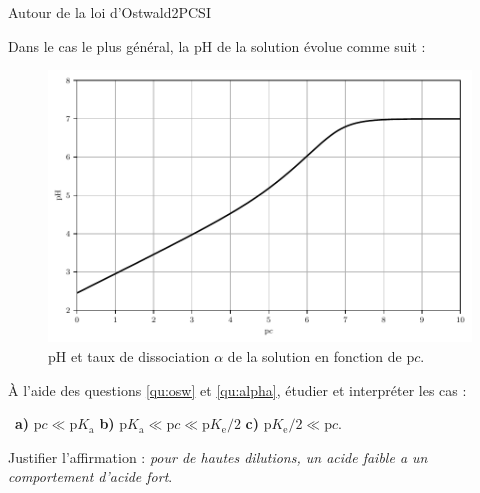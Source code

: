 \begin{exercise}{Autour de la loi d'Ostwald}{2}{PCSI}
\begin{questions}
\begin{EnvUplevel}
    Dans le cas le plus général, la pH de la solution évolue comme suit : \vspace{-1em}
    \begin{figure}[H]
        \includegraphics[width=\linewidth]{chimie/pH/ostwald.pdf}\vspace{-.8em}
        \caption{pH et taux de dissociation $\alpha$ de la solution en fonction de p$c$.}
    \end{figure}
\end{EnvUplevel}

\question \`A l'aide des questions \ref{qu:osw} et \ref{qu:alpha}, étudier et interpréter les cas :

~\hfill \textbf{\sffamily a)} $\text{p}c \ll \text{p}K_\text{a}$ \hfill 
\textbf{\sffamily b)} $\text{p}K_\text{a} \ll \text{p}c \ll \text{p}K_\text{e}/2$ \hfill
\textbf{\sffamily c)} $ \text{p}K_\text{e}/2 \ll \text{p}c$. \hfill ~

\question Justifier l'affirmation : \textsl{pour de hautes dilutions, un acide faible a un comportement d'acide fort}.

\end{questions}
\end{exercise}

